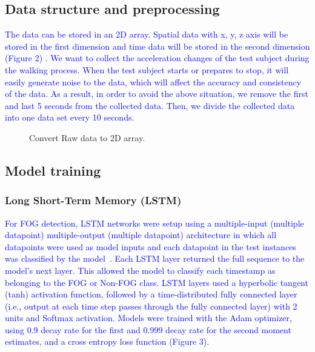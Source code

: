\documentclass[10pt,twocolumn,letterpaper]{article}
\begin{document}
\subsection{Data structure and preprocessing}
\label{sec:data_structure}

\textcolor{blue}{
    The data can be stored in an 2D array. Spatial data with x, y, z axis will be stored in the first dimension and time data will be stored in the second dimension (Figure 2) . We want to collect the acceleration changes of the test subject during the walking process. When the test subject starts or prepares to stop, it will easily generate noise to the data, which will affect the accuracy and consistency of the data. As a result, in order to avoid the above situation, we remove the first and last 5 seconds from the collected data. Then, we divide the collected data into one data set every 10 seconds.
}

\begin{figure}[t]
    \centering
    \caption{Convert Raw data to 2D array.}
    \label{fig:f2}
\end{figure}

\subsection{Model training}
\label{sec:model_training}

\subsubsection*{Long Short-Term Memory (LSTM)}
\label{sec:lstm}

\textcolor{blue}{
    For FOG detection, LSTM networks were setup using a multiple-input (multiple datapoint) multiple-output (multiple datapoint) architecture in which all datapoints were used as model inputs and each datapoint in the test instances was classified by the model~\cite[]{Shalin2021}. Each LSTM layer returned the full sequence to the model’s next layer. This allowed the model to classify each timestamp as belonging to the FOG or Non-FOG class. LSTM layers used a hyperbolic tangent (tanh) activation function, followed by a time-distributed fully connected layer (i.e., output at each time step passes through the fully connected layer) with 2 units and Softmax activation. Models were trained with the Adam optimizer, using 0.9 decay rate for the first and 0.999 decay rate for the second moment estimates, and a cross entropy loss function (Figure 3).
}
\end{document}

